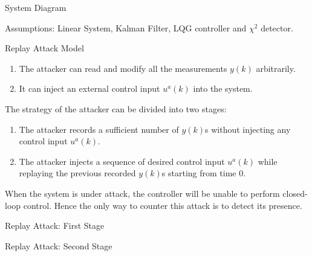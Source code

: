\documentclass[10pt]{beamer}
\newcommand{\tikzdir}[1]{#1.tikz}
\newcommand{\inputtikz}[1]{}}
\begin{document}
\begin{frame}{System Diagram}
  \begin{figure}[htpb]
    \begin{center}
      \inputtikz{systemdiagram}
    \end{center}
  \end{figure}
  Assumptions: Linear System, Kalman Filter, LQG controller and $\chi^2$ detector.
\end{frame}

\begin{frame}{Replay Attack Model}
  \begin{enumerate}
    \item The attacker can read and modify all the measurements $y(k)$ arbitrarily.
    \item It can inject an external control input $u^a(k)$ into the system. 
  \end{enumerate}
  The strategy of the attacker can be divided into two stages:
  \begin{enumerate}
    \item The attacker records a sufficient number of $y(k)$s without injecting any control input $u^a(k)$. 
    \item The attacker injects a sequence of desired control input $u^a(k)$ while replaying the previous recorded $y(k)$s starting from time $0$.
  \end{enumerate}
  When the system is under attack, the controller will be unable to perform closed-loop control. Hence the only way to counter this attack is to detect its presence. 
\end{frame}

\begin{frame}{Replay Attack: First Stage}
  \begin{figure}[htpb]
    \begin{center}
      \inputtikz{replaydiagramone}
    \end{center}
  \end{figure}
\end{frame}

\begin{frame}{Replay Attack: Second Stage}
  \begin{figure}[htpb]
    \begin{center}
      \inputtikz{replaydiagramtwo}
    \end{center}
  \end{figure}
\end{frame}
\end{document}
